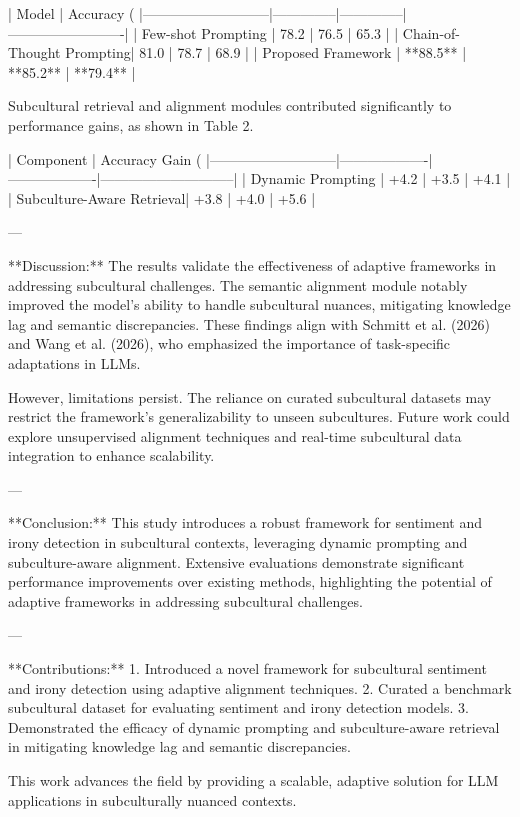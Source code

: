 | Model                     | Accuracy (%
|---------------------------|--------------|--------------|-------------------------|  
| Few-shot Prompting        | 78.2         | 76.5         | 65.3                   |  
| Chain-of-Thought Prompting| 81.0         | 78.7         | 68.9                   |  
| Proposed Framework        | **88.5**     | **85.2**     | **79.4**               |  

Subcultural retrieval and alignment modules contributed significantly to performance gains, as shown in Table 2.  

| Component                 | Accuracy Gain (%
|---------------------------|-------------------|-------------------|-----------------------------|  
| Dynamic Prompting         | +4.2             | +3.5             | +4.1                        |  
| Subculture-Aware Retrieval| +3.8             | +4.0             | +5.6                        |  

---

**Discussion:**  
The results validate the effectiveness of adaptive frameworks in addressing subcultural challenges. The semantic alignment module notably improved the model's ability to handle subcultural nuances, mitigating knowledge lag and semantic discrepancies. These findings align with Schmitt et al. (2026) and Wang et al. (2026), who emphasized the importance of task-specific adaptations in LLMs.  

However, limitations persist. The reliance on curated subcultural datasets may restrict the framework's generalizability to unseen subcultures. Future work could explore unsupervised alignment techniques and real-time subcultural data integration to enhance scalability.  

---

**Conclusion:**  
This study introduces a robust framework for sentiment and irony detection in subcultural contexts, leveraging dynamic prompting and subculture-aware alignment. Extensive evaluations demonstrate significant performance improvements over existing methods, highlighting the potential of adaptive frameworks in addressing subcultural challenges.  

---

**Contributions:**  
1. Introduced a novel framework for subcultural sentiment and irony detection using adaptive alignment techniques.  
2. Curated a benchmark subcultural dataset for evaluating sentiment and irony detection models.  
3. Demonstrated the efficacy of dynamic prompting and subculture-aware retrieval in mitigating knowledge lag and semantic discrepancies.  

This work advances the field by providing a scalable, adaptive solution for LLM applications in subculturally nuanced contexts.  